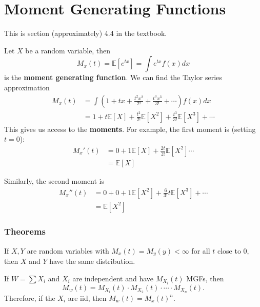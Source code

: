 \documentclass[titlepage, 12pt, leqno]{article}
\begin{document}
\section{Moment Generating Functions}
\begin{note}
    This is section (approximately) 4.4 in the textbook.
\end{note}
Let $X$ be a random variable, then 
\[
    M_{x}(t) = \mathbb{E}[e^{tx}] = \int e^{tx}f(x)dx
\]
is the \textbf{moment generating function}. We can find the Taylor series
approximation
\begin{align*}
    M_{x}(t)
    &= \int (1 + tx + \frac{t^{2}x^{2}}{2!} + \frac{t^{3}x^{3}}{3!} + \cdots )
    f(x)dx \\
    &= 1 + t\mathbb{E}[X] + \frac{t^{2}}{2!}\mathbb{E}[X^{2}] +
    \frac{t^{3}}{3!}\mathbb{E}[X^{3}] + \cdots 
\end{align*}
This gives us access to the \textbf{moments}. For example, the first moment is
(setting $t=0$):
\begin{align*}
    M_{x}'(t)
    &= 0 + 1\mathbb{E}[X] + \frac{2t}{2!}\mathbb{E}[X^{2}] \cdots  \\
    &= \mathbb{E}[X]
\end{align*}

Similarly, the second moment is
\begin{align*}
    M_{x}''(t)
    &= 0 + 0 + 1\mathbb{E}[X^{2}] + \frac{6}{3!}t \mathbb{E}[X^{3}] + \cdots \\
    &= \mathbb{E}[X^{2}]
\end{align*}

\subsubsection{Theorems}
If $X,Y$ are random variables with $M_{x}(t) = M_{y}(y) < \infty$ for all
$t$ close to 0, then $X$ and $Y$ have the same distribution.

If $W = \sum X_{i}$ and $X_{i}$ are independent and have $M_{X_{i}}(t)$ MGFs,
then
\[
    M_{w}(t) = M_{X_{i}}(t) \cdot M_{X_{2}}(t) \cdot \cdots \cdot 
    M_{X_{n}}(t).
\]
Therefore, if the $X_{i}$ are iid, then $M_{w}(t) = M_{x}(t)^{n}$.
\end{document}
